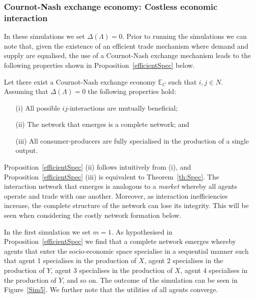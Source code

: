 \subsubsection{Cournot-Nash exchange economy: Costless economic interaction}

In these simulations we set $\Delta(\Lambda) = 0$. Prior to running the simulations we can note that, given the existence of an efficient trade mechanism where demand and supply are equalised, the use of a Cournot-Nash exchange mechanism leads to the following properties shown in Proposition~\ref{efficientSpec} below.

\begin{proposition} \label{efficientSpec}
Let there exist a Cournot-Nash exchange economy $\mathbb{E}_{C}$ such that $i,j \in N$. Assuming that $\Delta(\Lambda) = 0$ the following properties hold:
\begin{itemize}
	\item[(i)] All possible $ij$-interactions are mutually beneficial;
	\item[(ii)] The network that emerges is a complete network; and
	\item[(iii)] All consumer-producers are fully specialised in the production of a single output.
\end{itemize}
\end{proposition}

Proposition~\ref{efficientSpec} (ii) follows intuitively from (i), and Proposition~\ref{efficientSpec} (iii) is equivalent to Theorem~\ref{th:Spec}. The interaction network that emerges is analogous to a \emph{market} whereby all agents operate and trade with one another. Moreover, as interaction inefficiencies increase, the complete structure of the network can lose its integrity. This will be seen when considering the costly network formation below.

In the first simulation we set $m = 1$. As hypothesised in Proposition~\ref{efficientSpec} we find that a complete network emerges whereby agents that enter the socio-economic space specialise in a sequential manner such that agent 1 specialises in the production of $X$, agent 2 specialises in the production of $Y$, agent 3 specialises in the production of $X$, agent 4 specialises in the production of $Y$, and so on. The outcome of the simulation can be seen in Figure~\ref{Sim5}. We further note that the utilities of all agents converge.

